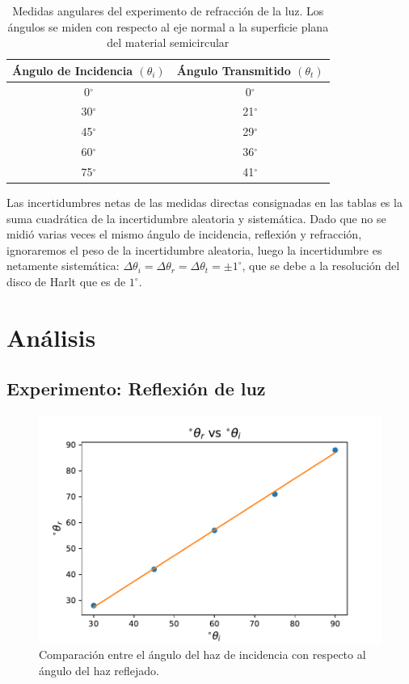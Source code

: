\documentclass[
aps,
reprint,
amsmath, amssymb,
superscriptaddress,
]{revtex4-2}
\begin{document}
\begin{table}[H]%
    \caption{\label{tab:tabla2} Medidas angulares del experimento de refracción de la luz. Los ángulos se miden con respecto al eje normal a la superficie plana del material semicircular}
     \begin{ruledtabular}
     \begin{tabular}{cc}
        Ángulo de Incidencia $(\theta_i)$ & Ángulo Transmitido $(\theta_t)$ \\
        \hline
        0$^{\circ}$  & 0$^{\circ}$ \\
        30$^{\circ}$ & 21$^{\circ}$ \\
        45$^{\circ}$ & 29$^{\circ}$ \\
        60$^{\circ}$ & 36$^{\circ}$\\
        75$^{\circ}$ & 41$^{\circ}$
     \end{tabular}
     \end{ruledtabular}
\end{table}
Las incertidumbres netas de las medidas directas consignadas en las tablas es la suma cuadrática de la incertidumbre aleatoria y sistemática. Dado que no se midió varias veces el mismo ángulo de incidencia, reflexión y refracción, ignoraremos el peso de la incertidumbre aleatoria, luego la incertidumbre es netamente sistemática: $\Delta \theta_i = \Delta \theta_r = \Delta \theta_t = \pm 1^{\circ}$, que se debe a la resolución del disco de Harlt que es de $1^{\circ}$.

\section{Análisis}
\subsection{Experimento: Reflexión de luz}
\begin{figure}
\centering
\includegraphics[width=\columnwidth]{img/angulos.pdf}
\caption{\label{fig:img_2} Comparación entre el ángulo del haz de incidencia con respecto al ángulo del haz reflejado.}
\end{figure}
\end{document}
